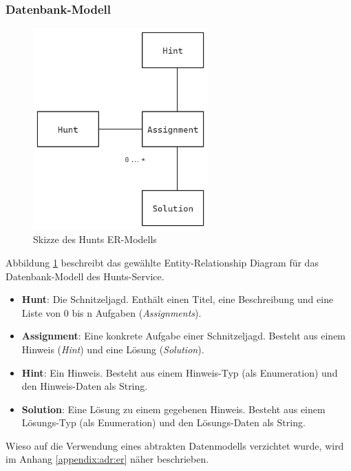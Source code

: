 \subsubsection{Datenbank-Modell}

\begin{figure}[H]
    \centering
    \includegraphics[width=0.6\textwidth]{images/PrAr-Software-Entwurf-Hunt-Api-Hunt-Service-Er.png}
    \caption{Skizze des Hunts ER-Modells}
    \label{fig:swentwurf:huntapi:huntservice:er}
\end{figure}

Abbildung \ref{fig:swentwurf:huntapi:huntservice:er} beschreibt das gewählte Entity-Relationship Diagram für das Datenbank-Modell des Hunts-Service.

\begin{itemize}
    \item \textbf{Hunt}: Die Schnitzeljagd. Enthält einen Titel, eine Beschreibung und eine Liste von 0 bis n Aufgaben (\textit{Assignments}).
    \item \textbf{Assignment}: Eine konkrete Aufgabe einer Schnitzeljagd. Besteht aus einem Hinweis (\textit{Hint}) und eine Lösung (\textit{Solution}).
    \item \textbf{Hint}: Ein Hinweis. Besteht aus einem Hinweis-Typ (als Enumeration) und den Hinweis-Daten als String.
    \item \textbf{Solution}: Eine Lösung zu einem gegebenen Hinweis. Besteht aus einem Lösungs-Typ (als Enumeration) und den Lösungs-Daten als String.
\end{itemize}

Wieso auf die Verwendung eines abtrakten Datenmodells verzichtet wurde, wird im Anhang \ref{appendix:adr:er} näher beschrieben.

